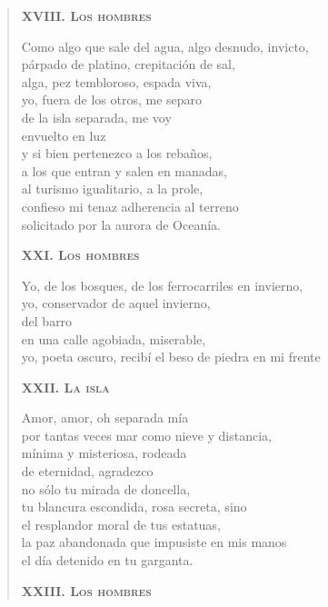 \documentclass[12pt]{article}
\begin{document}
\begin{verse}
{\bfseries\scshape {XVIII. Los hombres}}

Como algo que sale del agua, algo desnudo, invicto,\\
párpado de platino, crepitación de sal,\\
alga, pez tembloroso, espada viva,\\
yo, fuera de los otros, me separo\\
de la isla separada, me voy\\
envuelto en luz\\
y si bien pertenezco a los rebaños,\\
a los que entran y salen en manadas,\\
al turismo igualitario, a la prole,\\
confieso mi tenaz adherencia al terreno\\
solicitado por la aurora de Oceanía.  

{\bfseries\scshape {XXI. Los hombres}}

Yo, de los bosques, de los ferrocarriles en invierno,\\
yo, conservador de aquel invierno,\\
del barro\\
en una calle agobiada, miserable,\\
yo, poeta oscuro, recibí el beso de piedra en mi frente  

{\bfseries\scshape {XXII. La isla}}

Amor, amor, oh separada mía\\
por tantas veces mar como nieve y distancia,\\
mínima y misteriosa, rodeada\\
de eternidad, agradezco\\
no sólo tu mirada de doncella,\\
tu blancura escondida, rosa secreta, sino\\
el resplandor moral de tus estatuas,\\
la paz abandonada que impusiste en mis manos\\
el día detenido en tu garganta.  

{\bfseries\scshape {XXIII. Los hombres}}


\end{verse}
\end{document}
